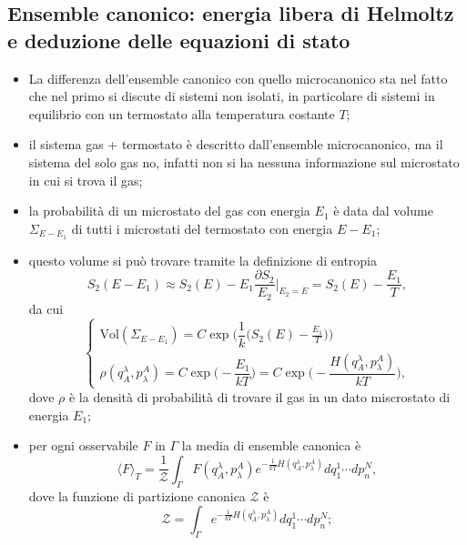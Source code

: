 \documentclass{article}
\theoremstyle{remark}
\begin{document}
\subsection{Ensemble canonico: energia libera di Helmoltz e deduzione delle equazioni di stato}
\begin{itemize}
    \item La differenza dell'ensemble canonico con quello microcanonico sta nel fatto che nel primo si discute di sistemi non isolati, in particolare di sistemi in equilibrio con un termostato alla temperatura costante $T$;
    \item il sistema gas + termostato è descritto dall'ensemble microcanonico, ma il sistema del solo gas no, infatti non si ha nessuna informazione sul microstato in cui si trova il gas;
    \item la probabilità di un microstato del gas con energia $E_1$ è data dal volume $\Sigma_{E-E_1}$ di tutti i microstati del termostato con energia $E-E_1$;
    \item questo volume si può trovare tramite la definizione di entropia
    \begin{equation}
        S_2(E-E_1)\approx S_2(E)-E_1\frac{\partial S_2}{E_2}\bigg|_{E_2=E}=S_2(E)-\frac{E_1}{T},
    \end{equation}
    da cui
    \begin{equation}
        \begin{cases}
            \text{Vol}(\Sigma_{E-E_1})=C\exp\bigg(\dfrac{1}{k}\bigg(S_2(E)-\frac{E_1}{T}\bigg)\bigg) \\
            \rho(q^\lambda_A,p_\lambda^A)=C\exp\bigg(-\dfrac{E_1}{kT}\bigg)=C\exp\bigg(-\dfrac{H(q^\lambda_A,p_\lambda^A)}{kT}\bigg),
        \end{cases}
    \end{equation}
    dove $\rho$ è la densità di probabilità di trovare il gas in un dato miscrostato di energia $E_1$;
    \item per ogni osservabile $F$ in $\Gamma$ la media di ensemble canonica è
    \begin{equation}
        \langle F\rangle_T=\frac{1}{\mathcal{Z}}\int_{\Gamma}F(q^\lambda_A,p_\lambda^A)e^{-\frac{1}{kT}H(q^\lambda_A,p_\lambda^A)}dq^1_1\cdots dp_n^N,
    \end{equation}
    dove la funzione di partizione canonica $\mathcal{Z}$ è
    \begin{equation}
        \mathcal{Z}=\int_{\Gamma}e^{-\frac{1}{kT}H(q^\lambda_A,p_\lambda^A)}dq^1_1\cdots dp_n^N;
    \end{equation}

\end{itemize}
\end{document}
